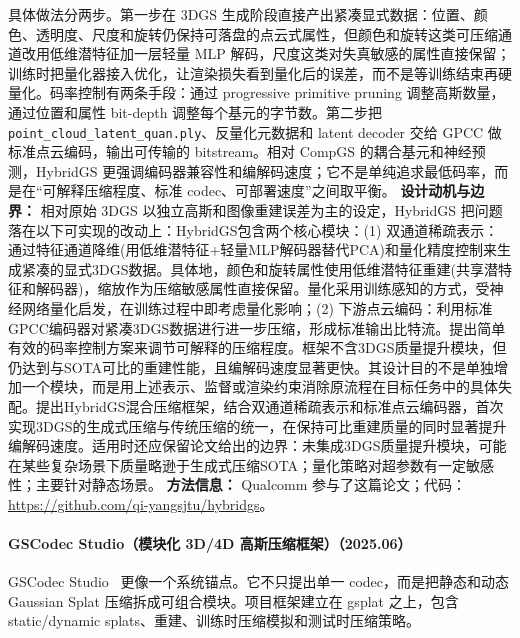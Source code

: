 具体做法分两步。第一步在 3DGS 生成阶段直接产出紧凑显式数据：位置、颜色、透明度、尺度和旋转仍保持可落盘的点云式属性，但颜色和旋转这类可压缩通道改用低维潜特征加一层轻量 MLP 解码，尺度这类对失真敏感的属性直接保留；训练时把量化器接入优化，让渲染损失看到量化后的误差，而不是等训练结束再硬量化。码率控制有两条手段：通过 progressive primitive pruning 调整高斯数量，通过位置和属性 bit-depth 调整每个基元的字节数。第二步把 \texttt{point\_cloud\_latent\_quan.ply}、反量化元数据和 latent decoder 交给 GPCC 做标准点云编码，输出可传输的 bitstream。相对 CompGS 的耦合基元和神经预测，HybridGS 更强调编码器兼容性和编解码速度；它不是单纯追求最低码率，而是在“可解释压缩程度、标准 codec、可部署速度”之间取平衡。
\textbf{设计动机与边界：} 相对原始 3DGS 以独立高斯和图像重建误差为主的设定，HybridGS 把问题落在以下可实现的改动上：HybridGS包含两个核心模块：(1) 双通道稀疏表示：通过特征通道降维(用低维潜特征+轻量MLP解码器替代PCA)和量化精度控制来生成紧凑的显式3DGS数据。具体地，颜色和旋转属性使用低维潜特征重建(共享潜特征和解码器)，缩放作为压缩敏感属性直接保留。量化采用训练感知的方式，受神经网络量化启发，在训练过程中即考虑量化影响；(2) 下游点云编码：利用标准GPCC编码器对紧凑3DGS数据进行进一步压缩，形成标准输出比特流。提出简单有效的码率控制方案来调节可解释的压缩程度。框架不含3DGS质量提升模块，但仍达到与SOTA可比的重建性能，且编解码速度显著更快。其设计目的不是单独增加一个模块，而是用上述表示、监督或渲染约束消除原流程在目标任务中的具体失配。提出HybridGS混合压缩框架，结合双通道稀疏表示和标准点云编码器，首次实现3DGS的生成式压缩与传统压缩的统一，在保持可比重建质量的同时显著提升编解码速度。适用时还应保留论文给出的边界：未集成3DGS质量提升模块，可能在某些复杂场景下质量略逊于生成式压缩SOTA；量化策略对超参数有一定敏感性；主要针对静态场景。
\textbf{方法信息：} Qualcomm 参与了这篇论文；代码：\url{https://github.com/qi-yangsjtu/hybridgs}。



\paragraph{GSCodec Studio（模块化 3D/4D 高斯压缩框架）（2025.06）}
GSCodec Studio~\cite{2506_01822} 更像一个系统锚点。它不只提出单一 codec，而是把静态和动态 Gaussian Splat 压缩拆成可组合模块。项目框架建立在 gsplat 之上，包含 static/dynamic splats、重建、训练时压缩模拟和测试时压缩策略。

